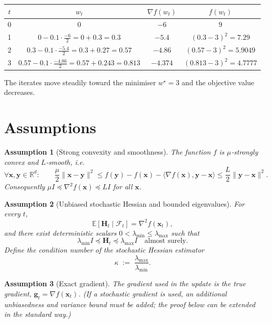 \documentclass{article}
\newtheorem{assumption}{Assumption}
\newcommand{\E}{\mathbb{E}}
\newcommand{\R}{\mathbb{R}}
\newcommand{\ip}[2]{\langle #1,#2\rangle}
\newcommand{\grad}{\nabla}
\newcommand{\Hess}{\nabla^{2}}
\begin{document}
\begin{center}
\begin{tabular}{c|c|c|c}
$t$ & $w_{t}$ & $\grad f(w_{t})$ & $f(w_{t})$\\ \hline
0 & $0$ & $-6$ & $9$\\
1 & $0-0.1\cdot\frac{-6}{2}=0+0.3=0.3$ & $-5.4$ & $(0.3-3)^{2}=7.29$\\
2 & $0.3-0.1\cdot\frac{-5.4}{2}=0.3+0.27=0.57$ & $-4.86$ & $(0.57-3)^{2}=5.9049$\\
3 & $0.57-0.1\cdot\frac{-4.86}{2}=0.57+0.243=0.813$ & $-4.374$ & $(0.813-3)^{2}=4.7777$
\end{tabular}
\end{center}
The iterates move steadily toward the minimiser $w^{\star}=3$ and the objective value decreases.

\newpage
\section*{Assumptions}
\begin{assumption}[Strong convexity and smoothness]\label{ass:strong}
The function $f$ is $\mu$‑strongly convex and $L$‑smooth, i.e.
\[
\forall \mathbf x,\mathbf y\in\R^{d}:\qquad
\frac{\mu}{2}\|\mathbf x-\mathbf y\|^{2}
\le f(\mathbf y)-f(\mathbf x)-\ip{\grad f(\mathbf x)}{\mathbf y-\mathbf x}
\le \frac{L}{2}\|\mathbf y-\mathbf x\|^{2}.
\tag{2}
\]
Consequently $ \mu I \preceq \Hess f(\mathbf x) \preceq L I$ for all $\mathbf x$.
\end{assumption}

\begin{assumption}[Unbiased stochastic Hessian and bounded eigenvalues]\label{ass:hessian}
For every $t$,
\[
\E[\mathbf H_{t}\mid\mathcal F_{t}]=\Hess f(\mathbf x_{t}),
\]
and there exist deterministic scalars $0<\lambda_{\min}\le\lambda_{\max}$ such that
\[
\lambda_{\min} I \preceq \mathbf H_{t}\preceq \lambda_{\max} I
\quad\text{almost surely.}
\tag{3}
\]
Define the condition number of the stochastic Hessian estimator
\[
\kappa\;:=\;\frac{\lambda_{\max}}{\lambda_{\min}}.
\]
\end{assumption}

\begin{assumption}[Exact gradient]\label{ass:grad}
The gradient used in the update is the true gradient,
$\mathbf g_{t}= \grad f(\mathbf x_{t})$.
(If a stochastic gradient is used, an additional unbiasedness and variance bound
must be added; the proof below can be extended in the standard way.)
\end{assumption}
\end{document}
